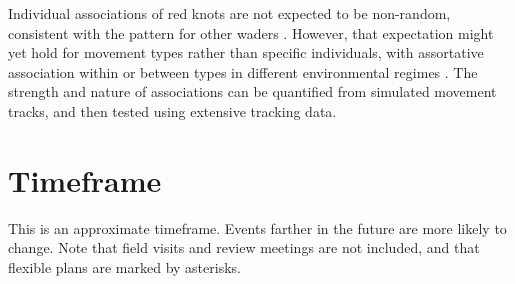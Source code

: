 Individual associations of red knots are not expected to be non-random, consistent with the pattern for other waders \citep{myers1983, conklin2008}. However, that expectation might yet hold for movement types rather than specific individuals, with assortative association within or between types in different environmental regimes \citep{spiegel2017}. The strength and nature of associations can be quantified from simulated movement tracks, and then tested using extensive tracking data.

\newpage


\part{Timeframe}

This is an approximate timeframe. Events farther in the future are more likely to change. Note that field visits and review meetings are not included, and that flexible plans are marked by asterisks.


